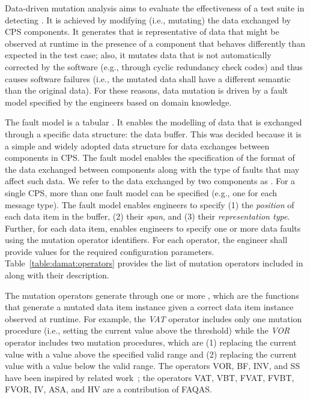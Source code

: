 {Data-driven mutation analysis aims to evaluate the effectiveness of a test suite in detecting . 
It is achieved by modifying (i.e., mutating) the data exchanged by CPS components. It generates  that is representative of data that might be observed at runtime in the presence of a component that behaves differently than expected in the test case; also, it mutates  data that is not automatically corrected by the software 
(e.g., through cyclic redundancy check codes)
and thus causes software failures (i.e., the mutated data shall have a different semantic than the original data). For these reasons, data mutation is driven by a fault model specified by the engineers based on domain knowledge.


The \DAMAT fault model is 
a tabular .
It enables the modelling of data that is exchanged through a specific data structure: the data buffer. This was decided because it is a simple and widely adopted data structure for data exchanges between components in CPS. 
The \DAMAT fault model enables the specification of the format of the data exchanged between components along with the type of faults that may affect such data. 
We refer to the data exchanged by two components as . For a single CPS, more than one fault model can be specified (e.g., one for each message type). 
The \DAMAT fault model enables engineers to specify (1) the \emph{position} of each data item in the buffer, (2) their \emph{span}, and (3) their \emph{representation type}. 
Further, for each data item, \DAMAT enables engineers to specify one or more data faults using the mutation operator identifiers. For each operator, the engineer shall provide values for the required configuration parameters.
Table~\ref{table:damat:operators} provides the list of mutation operators included in \DAMAT along with their description. 



The \DAMAT mutation operators generate  through one or more , which are the functions that generate a mutated data item instance given a correct data item instance observed at runtime. For example, the \emph{VAT} operator includes only one mutation procedure (i.e., setting the current value above the threshold) while the \emph{VOR} operator includes two mutation procedures, which are
(1) replacing the current value with a value above the specified valid range and (2) replacing the current value with a value below the valid range.
The operators VOR, BF, INV, and SS have been inspired by related work~\cite{di2015generating,PeachFuzzer,Matinnejad19}; the operators VAT, VBT, FVAT, FVBT, FVOR, IV, ASA,  and HV
are a contribution of FAQAS.

}
